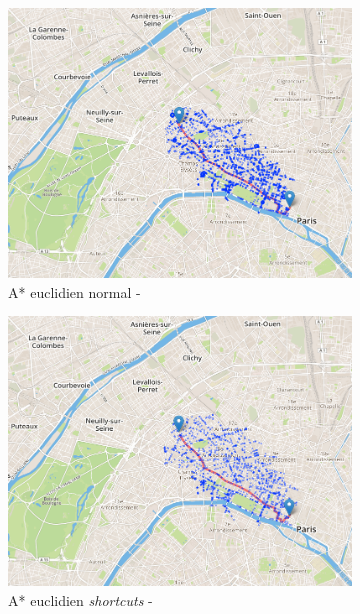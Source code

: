 \documentclass[a4paper, 11pt, DIV=12, numbers=enddot]{scrartcl}
\begin{document}
\begin{figure}[!h]
  \begin{subfigure}[b]{.49\textwidth}
    \includegraphics[width=\textwidth]{fig/euclidien.png}
    \caption{A* euclidien normal - }
  \end{subfigure}
  \hfill
  \begin{subfigure}[b]{.49\textwidth}
    \includegraphics[width=\textwidth]{fig/euclidien_hl.png}
    \caption{A* euclidien \emph{shortcuts} - }
  \end{subfigure}
  \newline\newline
  \begin{subfigure}[b]{.49\textwidth}

\end{subfigure}
\end{figure}
\end{document}
